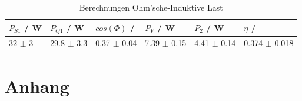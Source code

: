 \documentclass[12pt,a4paper,twoside]{article}
\begin{document}
\begin{table}[H]
    \centering
    \caption{Berechnungen Ohm'sche-Induktive Last}
    \label{tab:BerechnungenOhmIndAW}
    \begin{tabular}{| l | l | l | l | l | l |}
        \hline
        $P_{S1}$ / W & $P_{Q1}$ / W & $cos(\Phi)$ / & $P_{V}$ / W & $P_{2}$ / W & $\eta$ / \\
        \hline
        32 $\pm$ 3 & 29.8 $\pm$ 3.3 & 0.37 $\pm$ 0.04 & 7.39 $\pm$ 0.15 & 4.41 $\pm$ 0.14 & 0.374 $\pm$ 0.018 \\
        \hline
    \end{tabular}
\end{table}



\section{Anhang}



\printbibliography[heading=bibintoc]
\end{document}
